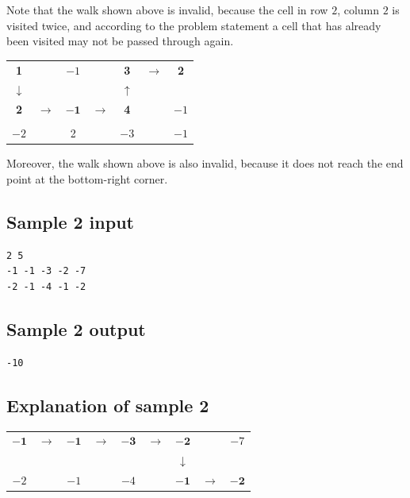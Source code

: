 \documentclass[11pt]{article}
\begin{document}
Note that the walk shown above is invalid, because the cell in row $2$,
column $2$ is visited twice, and according to the problem statement a cell
that has already been visited may not be passed through again.

\begin{center}
\begin{tabular}{ccccccc}
\textbf{1} & & $-1$ & & \textbf{3} & $\rightarrow$ & \textbf{2} \\
$\downarrow$ & & & & $\uparrow$ & & \\
\textbf{2} & $\rightarrow$ & $\mathbf{-1}$ & $\rightarrow$ & \textbf{4}
  & & $-1$ \\
 & & & & & & \\
$-2$ & & 2 & & $-3$ & & $-1$ \\
\end{tabular}
\end{center}

Moreover, the walk shown above is also invalid, because it does not reach
the end point at the bottom-right corner.

\subsection*{Sample 2 input}

\begin{verbatim}
2 5
-1 -1 -3 -2 -7
-2 -1 -4 -1 -2
\end{verbatim}

\subsection*{Sample 2 output}

\begin{verbatim}
-10
\end{verbatim}

\subsection*{Explanation of sample 2}

\begin{center}
\begin{tabular}{ccccccccc}
$\mathbf{-1}$ & $\rightarrow$ & $\mathbf{-1}$ & $\rightarrow$
  & $\mathbf{-3}$ & $\rightarrow$ & $\mathbf{-2}$ & & $-7$ \\
 & & & & & & $\downarrow$ & & \\
$-2$ & & $-1$ & & $-4$ & & $\mathbf{-1}$ & $\rightarrow$
  & $\mathbf{-2}$ \\
\end{tabular}
\end{center}
\end{document}
